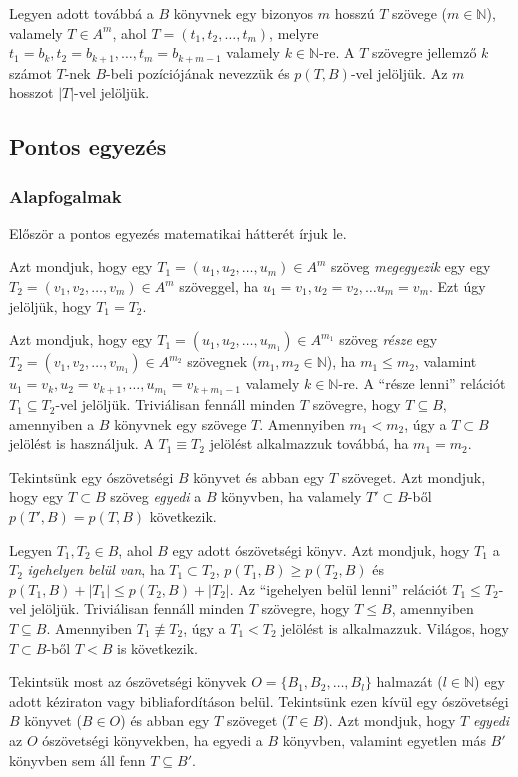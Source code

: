 \documentclass{article}
\begin{document}
Legyen adott továbbá a $B$ könyvnek egy bizonyos $m$ hosszú $T$ szövege ($m\in\mathbb{N}$), valamely $T\in A^m$, ahol
$T=(t_1,t_2,\ldots,t_m)$, melyre $t_1=b_k,t_2=b_{k+1},\ldots,t_m=b_{k+m-1}$ valamely $k\in\mathbb{N}$-re. A
$T$ szövegre jellemző $k$ számot $T$-nek $B$-beli pozíciójának nevezzük és $p(T,B)$-vel jelöljük.
Az $m$ hosszot $|T|$-vel jelöljük.

\subsection{Pontos egyezés}

\subsubsection{Alapfogalmak}

Először a pontos egyezés matematikai hátterét írjuk le.

Azt mondjuk, hogy egy $T_1=(u_1,u_2,\ldots,u_m)\in A^{m}$ szöveg \textit{megegyezik} egy
egy $T_2=(v_1,v_2,\ldots,v_m)\in A^{m}$ szöveggel, ha $u_1=v_1, u_2=v_2, \ldots u_m=v_m$.
Ezt úgy jelöljük, hogy $T_1=T_2$.

Azt mondjuk, hogy egy $T_1=(u_1,u_2,\ldots,u_{m_1})\in A^{m_1}$ szöveg \textit{része}
egy $T_2=(v_1,v_2,\ldots,v_{m_1})\in A^{m_2}$ szövegnek ($m_1,m_2\in\mathbb{N}$),
ha $m_1\leq m_2$, valamint $u_1=v_{k},u_2=v_{k+1},\ldots,u_{m_1}=v_{k+m_1-1}$ valamely $k\in\mathbb{N}$-re.
A ``része lenni'' relációt $T_1\subseteq T_2$-vel jelöljük. Triviálisan fennáll minden
$T$ szövegre, hogy $T\subseteq B$, amennyiben a $B$ könyvnek egy szövege $T$.
Amennyiben $m_1<m_2$, úgy a $T\subset B$ jelölést is használjuk.
A $T_1\equiv T_2$ jelölést alkalmazzuk továbbá, ha $m_1=m_2$.

Tekintsünk egy ószövetségi $B$ könyvet és abban egy $T$ szöveget. Azt mondjuk, hogy egy $T\subset B$ szöveg
\textit{egyedi} a $B$ könyvben, ha valamely $T'\subset B$-ből $p(T',B)=p(T,B)$ következik.

Legyen $T_1,T_2\in B$, ahol $B$ egy adott ószövetségi könyv. Azt mondjuk, hogy $T_1$ a $T_2$
\textit{igehelyen belül van}, ha $T_1\subset T_2$, $p(T_1,B)\geq p(T_2,B)$ és $p(T_1,B)+|T_1|\leq p(T_2,B)+|T_2|$.
Az ``igehelyen belül lenni'' relációt $T_1\leq T_2$-vel jelöljük. Triviálisan fennáll minden
$T$ szövegre, hogy $T\leq B$, amennyiben $T\subseteq B$. Amennyiben $T_1\not\equiv T_2$, úgy
a $T_1<T_2$ jelölést is alkalmazzuk. Világos, hogy $T\subset B$-ből $T<B$ is következik.

Tekintsük most az ószövetségi könyvek $O=\{B_1,B_2,\ldots,B_l\}$ halmazát ($l\in\mathbb{N}$) egy adott kéziraton
vagy bibliafordításon belül.
Tekintsünk ezen kívül egy ószövetségi $B$ könyvet ($B\in O$) és abban egy $T$ szöveget ($T\in B$). Azt mondjuk, hogy
$T$ \textit{egyedi} az $O$ ószövetségi könyvekben, ha egyedi a $B$ könyvben, valamint egyetlen más $B'$ könyvben
sem áll fenn $T\subseteq B'$.
\end{document}
